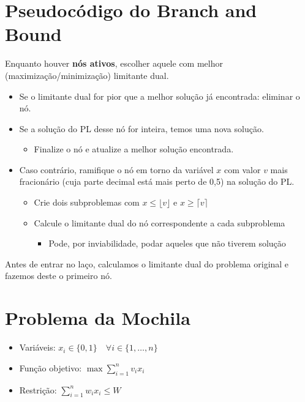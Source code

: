 \section{Pseudocódigo do Branch and Bound}

Enquanto houver \textbf{nós ativos}, escolher aquele com melhor (maximização/minimização) limitante dual.

\begin{itemize}
    \item Se o limitante dual for pior que a melhor solução já encontrada: eliminar o nó.
    \item Se a solução do PL desse nó for inteira, temos uma nova solução.
    \begin{itemize}
        \item Finalize o nó e atualize a melhor solução encontrada.
    \end{itemize}
    \item Caso contrário, ramifique o nó em torno da variável $x$ com valor $v$ mais fracionário (cuja parte decimal está mais perto de 0,5) na solução do PL.
    \begin{itemize}
        \item Crie dois subproblemas com $x\leq\lfloor v \rfloor$ e $x\geq\lceil v \rceil$
        \item Calcule o limitante dual do nó correspondente a cada subproblema
        \begin{itemize}
            \item Pode, por inviabilidade, podar aqueles que não tiverem solução
        \end{itemize}
    \end{itemize}
\end{itemize}

Antes de entrar no laço, calculamos o limitante dual do problema original e fazemos deste o primeiro nó.

\section{Problema da Mochila}

\begin{itemize}
    \item Variáveis: $x_i \in \{0,1\} \quad \forall i \in \{1,\dots,n\}$
    \item Função objetivo: $\max{\sum_{i=1}^nv_ix_i}$
    \item Restrição: $\sum_{i=1}^nw_ix_i\leq W$
\end{itemize}

